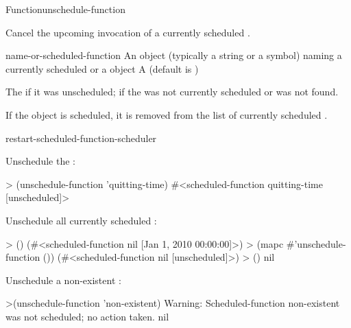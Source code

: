\documentclass[10pt,twoside,english,pdftex]{article}
\begin{document}
\begin{functiondoc}{Function}{unschedule-function}%
  {
     
  \returns{} } 
%
%
%
%

\fnsyntax

\fnpurpose Cancel the upcoming invocation of a currently scheduled
.

\fnpackage {}

\fnmodule {}

\fnargs
\begin{args}{name-or-scheduled-function}
 An object (typically a string or a
  symbol) naming a currently scheduled  or a
   object
\arg[verbose] A  
  (default is \textbf{})
\end{args}

\fnreturns The  if it was unscheduled; \nil{} if the 
 was not currently scheduled or was not found.

\fnerrors
\nothreads{}

\fndescription If the  object is scheduled, it is
removed from the list of currently scheduled .

\begin{alsos}{restart-scheduled-function-scheduler}
\end{alsos}

\fnexamples
Unschedule the  :
\begin{example}
> (unschedule-function 'quitting-time)
#<scheduled-function quitting-time [unscheduled]>
\end{example}

%
Unschedule all currently scheduled :
\begin{example}
> ()
(#<scheduled-function nil [Jan 1, 2010 00:00:00]>)
> (mapc #'unschedule-function ())
(#<scheduled-function nil [unscheduled]>)
> ()
nil
\end{example}

Unschedule a non-existent :
\begin{example}
>(unschedule-function 'non-existent)
Warning: Scheduled-function non-existent was not scheduled; no action taken.
nil
\end{example}

\end{functiondoc}
\end{document}
